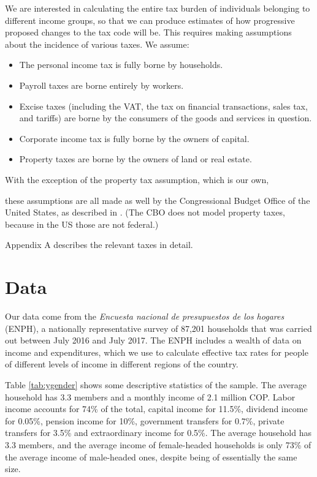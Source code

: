 \documentclass[12pt]{article}
\begin{document}
We are interested in calculating
the entire tax burden of individuals belonging to different income groups,
so that we can produce estimates of
how progressive proposed changes to the tax code will be.
This requires making assumptions about
the incidence of various taxes. We assume:

\begin{itemize}
  \item The personal income tax is fully borne by households.
  \item Payroll taxes are borne entirely by workers.
  \item Excise taxes
    (including the VAT,
    the tax on financial transactions,
    sales tax, and tariffs)
    are borne by the consumers of the goods and services in question.
  \item Corporate income tax is fully borne by the owners of capital.
  \item Property taxes are borne by
    the owners of land or real estate.
\end{itemize}

With the exception of the property tax assumption,
which is our own,
\iffalse
    [[LUIS:
    It is, right?]]
\fi
these assumptions are all made as well by
the Congressional Budget Office of the United States,
as described in \citet{salanie}.
(The CBO does not model property taxes,
because in the US those are not federal.)

Appendix A describes the relevant taxes in detail.

\section{Data}
Our data come from the
\textit{Encuesta nacional de presupuestos de los hogares} (ENPH),
a nationally representative survey of 87,201 households
that was carried out between July 2016 and July 2017.
The ENPH includes a wealth of data on income and expenditures,
which we use to calculate effective tax rates for
people of different levels of income in different regions of the country.

\iffalse
[[SOMEONE:
    Double-check each of these figures
    against the table it comes from.]]
[[JEFF:
    Since the underlying data is cleaner now,
    either regenerate the table
    or verify that the Makefile regenerates it.]]
\fi

Table \ref{tab:ygender} shows some descriptive statistics of the sample.
The average household has 3.3 members and a monthly income of 2.1 million COP.
Labor income accounts for 74\% of the total,
capital income for 11.5\%,
dividend income for 0.05\%,
pension income for 10\%,
government transfers for 0.7\%,
private transfers for 3.5\%
and extraordinary income for 0.5\%.
The average household has 3.3 members,
and the average income of female-headed households
is only 73\% of the average income of male-headed ones,
despite being of essentially the same size.
\end{document}
